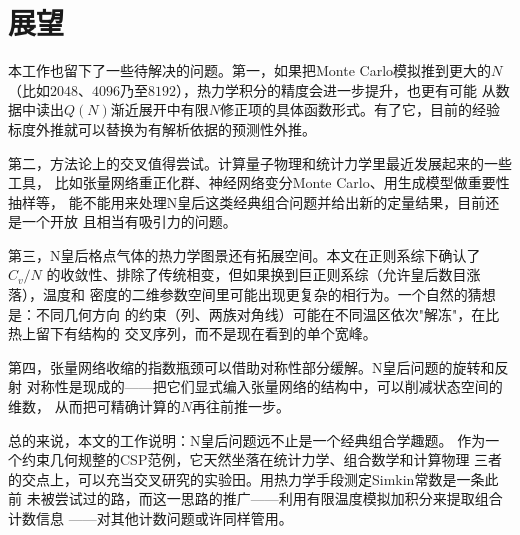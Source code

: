 \section{展望}

本工作也留下了一些待解决的问题。第一，如果把Monte Carlo模拟推到更大的$N$
（比如$2048$、$4096$乃至$8192$），热力学积分的精度会进一步提升，也更有可能
从数据中读出$Q(N)$渐近展开中有限$N$修正项的具体函数形式。有了它，目前的经验
标度外推就可以替换为有解析依据的预测性外推。

第二，方法论上的交叉值得尝试。计算量子物理和统计力学里最近发展起来的一些工具，
比如张量网络重正化群、神经网络变分Monte Carlo、用生成模型做重要性抽样等，
能不能用来处理N皇后这类经典组合问题并给出新的定量结果，目前还是一个开放
且相当有吸引力的问题。

第三，N皇后格点气体的热力学图景还有拓展空间。本文在正则系综下确认了$C_{v}/N$
的收敛性、排除了传统相变，但如果换到巨正则系综（允许皇后数目涨落），温度和
密度的二维参数空间里可能出现更复杂的相行为。一个自然的猜想是：不同几何方向
的约束（列、两族对角线）可能在不同温区依次"解冻"，在比热上留下有结构的
交叉序列，而不是现在看到的单个宽峰。

第四，张量网络收缩的指数瓶颈可以借助对称性部分缓解。N皇后问题的旋转和反射
对称性是现成的——把它们显式编入张量网络的结构中，可以削减状态空间的维数，
从而把可精确计算的$N$再往前推一步。

总的来说，本文的工作说明：N皇后问题远不止是一个经典组合学趣题。
作为一个约束几何规整的CSP范例，它天然坐落在统计力学、组合数学和计算物理
三者的交点上，可以充当交叉研究的实验田。用热力学手段测定Simkin常数是一条此前
未被尝试过的路，而这一思路的推广——利用有限温度模拟加积分来提取组合计数信息
——对其他计数问题或许同样管用。
